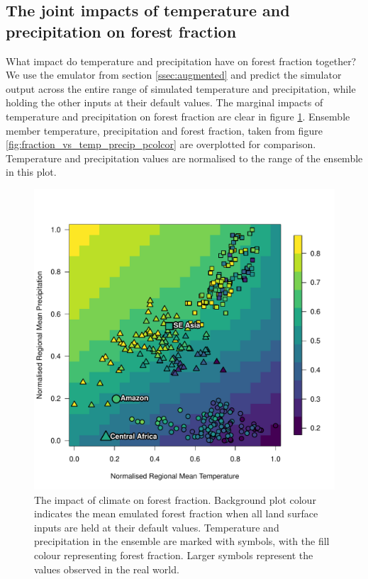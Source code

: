 \documentclass[gmd, manuscript]{copernicus}
\begin{document}
\subsection{The joint impacts of temperature and precipitation on forest fraction}\label{ssec:joint}
What impact do temperature and precipitation have on forest fraction together? We use the emulator from section \ref{ssec:augmented} and predict the simulator output across the entire range of simulated temperature and precipitation, while holding the other inputs at their default values. The marginal impacts of temperature and precipitation on forest fraction are clear in figure \ref{fig:taat_temp_precip_quilt}. Ensemble member temperature, precipitation and forest fraction, taken from figure \ref{fig:fraction_vs_temp_precip_pcolcor} are overplotted for comparison. Temperature and precipitation values are normalised to the range of the ensemble in this plot.

\begin{figure}[t]
\includegraphics[width=12cm]{../graphics/taat_temp_precip_quilt.pdf}
\caption{The impact of climate on forest fraction. Background plot colour indicates the mean emulated forest fraction when all land surface inputs are held at their default values. Temperature and precipitation in the ensemble are marked with symbols, with the fill colour representing forest fraction. Larger symbols represent the values observed in the real world.
}
\label{fig:taat_temp_precip_quilt}
\end{figure}
\end{document}
